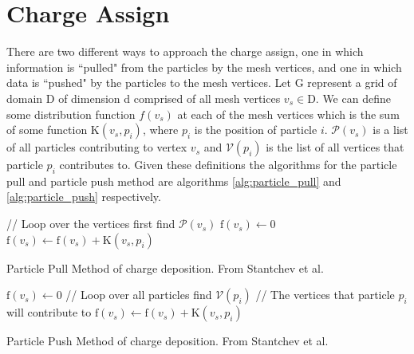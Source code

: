 	\section{Charge Assign}

There are two different ways to approach the charge assign, one in which information is ``pulled" from the particles by the mesh vertices, and one in which data is ``pushed" by the particles to the mesh vertices. Let G represent a grid of domain D of dimension d comprised of all mesh vertices $v_s  \in \mathrm{D}$. We can define some distribution function $f(v_s)$ at each of the mesh vertices which is the sum of some function $\mathrm{K}(v_s,p_i)$, where $p_i$ is the position of particle $i$. 
$\mathcal{P}(v_s)$ is a list of all particles contributing to vertex $v_s$ and $\mathcal{V}(p_i)$ is the list of all vertices that particle $p_i$ contributes to.
Given these definitions the algorithms for the particle pull and particle push method are algorithms \ref{alg:particle_pull} and \ref{alg:particle_push} respectively. 

\begin{algorithm}
	\begin{algorithmic}
		\STATE // Loop over the vertices first
			\STATE find $\mathcal{P}(v_s)$
			\STATE $\mathrm{f}(v_s) \leftarrow 0$
			\STATE $\mathrm{f}(v_s) \leftarrow \mathrm{f}(v_s) + \mathrm{K}(v_s,p_i)$
			\ENDFOR
		\ENDFOR
	\end{algorithmic}
	\caption[Particle Pull Method of charge deposition.]{Particle Pull Method of charge deposition. From Stantchev et al. \cite{Stantchev2008}}
	\label{alg:particle_pull}
\end{algorithm}

\begin{algorithm}
	\begin{algorithmic}
		\FORALL{$\mathrm{vertex} \: v_s \in G$}
			\STATE $\mathrm{f}(v_s) \leftarrow 0$
		\ENDFOR
		\STATE // Loop over all particles
		\FORALL{$\mathrm{particle} \: p_i \in \mathrm{D}$}
			\STATE find $\mathcal{V}(p_i)$ // The vertices that particle $p_i$ will contribute to
			\FORALL{$v_s \in \mathcal{V}(p_i)$}
				\STATE $\mathrm{f}(v_s) \leftarrow \mathrm{f}(v_s) + \mathrm{K}(v_s,p_i)$
			\ENDFOR
		\ENDFOR
	\end{algorithmic}
	\caption[Particle Push Method of charge deposition.]{Particle Push Method of charge deposition. From Stantchev et al. \cite{Stantchev2008}}
	\label{alg:particle_push}
\end{algorithm}

